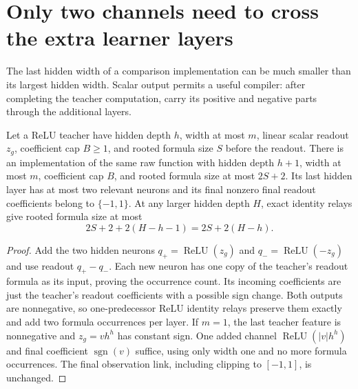\section{Only two channels need to cross the extra learner layers}
\label{sec:two-channel-padding}
The last hidden width of a comparison implementation can be much
smaller than its largest hidden width. Scalar output permits a useful
compiler: after completing the teacher computation, carry its positive
and negative parts through the additional layers.

\begin{lemma}
\label{lem:two-channel-compiler}
Let a ReLU teacher have hidden depth $h$, width at most $m$, linear
scalar readout $z_g$, coefficient cap $B\ge1$, and rooted formula
size $S$ before the readout. There is an implementation of the same
raw function with hidden depth $h+1$, width at most $m$,
coefficient cap $B$, and rooted formula size at most $2S+2$.
Its last hidden layer has at most two relevant neurons and its final
nonzero final readout coefficients belong to $\{-1,1\}$.
At any larger hidden depth $H$, exact identity relays give rooted
formula size at most
\begin{equation}
 2S+2+2(H-h-1)=2S+2(H-h).
 \label{eq:two-channel-formula-size}
\end{equation}
\end{lemma}
\begin{proof}
Add the two hidden neurons
$q_+=\operatorname{ReLU}(z_g)$ and
$q_-=\operatorname{ReLU}(-z_g)$ and use readout $q_+-q_-$.
Each new neuron has one copy of the teacher's readout formula as its
input, proving the occurrence count. Its incoming coefficients are
just the teacher's readout coefficients with a possible sign change.
Both outputs are nonnegative, so one-predecessor ReLU identity relays
preserve them exactly and add two formula occurrences per layer.
If $m=1$, the last teacher feature is nonnegative and $z_g=v h^h$ has constant sign. One added channel $\operatorname{ReLU}(|v|h^h)$ and final coefficient $\operatorname{sgn}(v)$ suffice, using only width one and no more formula occurrences. The final observation link, including clipping to $[-1,1]$, is unchanged.
\end{proof}

